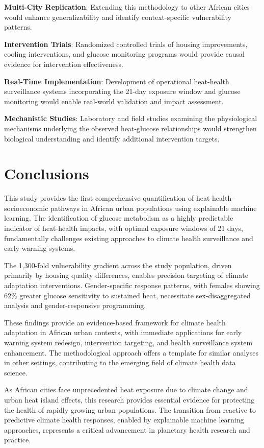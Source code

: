 \documentclass[journal,article,submit,pdftex,moreauthors]{Definitions/mdpi}
\begin{document}
\textbf{Multi-City Replication}: Extending this methodology to other African cities would enhance generalizability and identify context-specific vulnerability patterns.

\textbf{Intervention Trials}: Randomized controlled trials of housing improvements, cooling interventions, and glucose monitoring programs would provide causal evidence for intervention effectiveness.

\textbf{Real-Time Implementation}: Development of operational heat-health surveillance systems incorporating the 21-day exposure window and glucose monitoring would enable real-world validation and impact assessment.

\textbf{Mechanistic Studies}: Laboratory and field studies examining the physiological mechanisms underlying the observed heat-glucose relationships would strengthen biological understanding and identify additional intervention targets.

\section{Conclusions}

This study provides the first comprehensive quantification of heat-health-socioeconomic pathways in African urban populations using explainable machine learning. The identification of glucose metabolism as a highly predictable indicator of heat-health impacts, with optimal exposure windows of 21 days, fundamentally challenges existing approaches to climate health surveillance and early warning systems.

The 1,300-fold vulnerability gradient across the study population, driven primarily by housing quality differences, enables precision targeting of climate adaptation interventions. Gender-specific response patterns, with females showing 62\% greater glucose sensitivity to sustained heat, necessitate sex-disaggregated analysis and gender-responsive programming.

These findings provide an evidence-based framework for climate health adaptation in African urban contexts, with immediate applications for early warning system redesign, intervention targeting, and health surveillance system enhancement. The methodological approach offers a template for similar analyses in other settings, contributing to the emerging field of climate health data science.

As African cities face unprecedented heat exposure due to climate change and urban heat island effects, this research provides essential evidence for protecting the health of rapidly growing urban populations. The transition from reactive to predictive climate health responses, enabled by explainable machine learning approaches, represents a critical advancement in planetary health research and practice.
\end{document}
